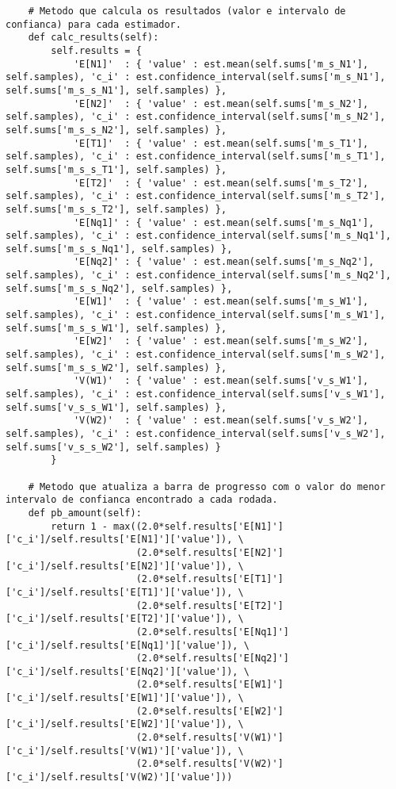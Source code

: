 \begin{lstlisting}
    # Metodo que calcula os resultados (valor e intervalo de confianca) para cada estimador.
    def calc_results(self):
        self.results = {
            'E[N1]'  : { 'value' : est.mean(self.sums['m_s_N1'], self.samples), 'c_i' : est.confidence_interval(self.sums['m_s_N1'], self.sums['m_s_s_N1'], self.samples) },
            'E[N2]'  : { 'value' : est.mean(self.sums['m_s_N2'], self.samples), 'c_i' : est.confidence_interval(self.sums['m_s_N2'], self.sums['m_s_s_N2'], self.samples) },
            'E[T1]'  : { 'value' : est.mean(self.sums['m_s_T1'], self.samples), 'c_i' : est.confidence_interval(self.sums['m_s_T1'], self.sums['m_s_s_T1'], self.samples) },
            'E[T2]'  : { 'value' : est.mean(self.sums['m_s_T2'], self.samples), 'c_i' : est.confidence_interval(self.sums['m_s_T2'], self.sums['m_s_s_T2'], self.samples) },
            'E[Nq1]' : { 'value' : est.mean(self.sums['m_s_Nq1'], self.samples), 'c_i' : est.confidence_interval(self.sums['m_s_Nq1'], self.sums['m_s_s_Nq1'], self.samples) },
            'E[Nq2]' : { 'value' : est.mean(self.sums['m_s_Nq2'], self.samples), 'c_i' : est.confidence_interval(self.sums['m_s_Nq2'], self.sums['m_s_s_Nq2'], self.samples) },
            'E[W1]'  : { 'value' : est.mean(self.sums['m_s_W1'], self.samples), 'c_i' : est.confidence_interval(self.sums['m_s_W1'], self.sums['m_s_s_W1'], self.samples) },
            'E[W2]'  : { 'value' : est.mean(self.sums['m_s_W2'], self.samples), 'c_i' : est.confidence_interval(self.sums['m_s_W2'], self.sums['m_s_s_W2'], self.samples) },
            'V(W1)'  : { 'value' : est.mean(self.sums['v_s_W1'], self.samples), 'c_i' : est.confidence_interval(self.sums['v_s_W1'], self.sums['v_s_s_W1'], self.samples) },
            'V(W2)'  : { 'value' : est.mean(self.sums['v_s_W2'], self.samples), 'c_i' : est.confidence_interval(self.sums['v_s_W2'], self.sums['v_s_s_W2'], self.samples) }
        }
    
    # Metodo que atualiza a barra de progresso com o valor do menor intervalo de confianca encontrado a cada rodada.
    def pb_amount(self):
        return 1 - max((2.0*self.results['E[N1]']['c_i']/self.results['E[N1]']['value']), \
                       (2.0*self.results['E[N2]']['c_i']/self.results['E[N2]']['value']), \
                       (2.0*self.results['E[T1]']['c_i']/self.results['E[T1]']['value']), \
                       (2.0*self.results['E[T2]']['c_i']/self.results['E[T2]']['value']), \
                       (2.0*self.results['E[Nq1]']['c_i']/self.results['E[Nq1]']['value']), \
                       (2.0*self.results['E[Nq2]']['c_i']/self.results['E[Nq2]']['value']), \
                       (2.0*self.results['E[W1]']['c_i']/self.results['E[W1]']['value']), \
                       (2.0*self.results['E[W2]']['c_i']/self.results['E[W2]']['value']), \
                       (2.0*self.results['V(W1)']['c_i']/self.results['V(W1)']['value']), \
                       (2.0*self.results['V(W2)']['c_i']/self.results['V(W2)']['value']))
            

\end{lstlisting}
